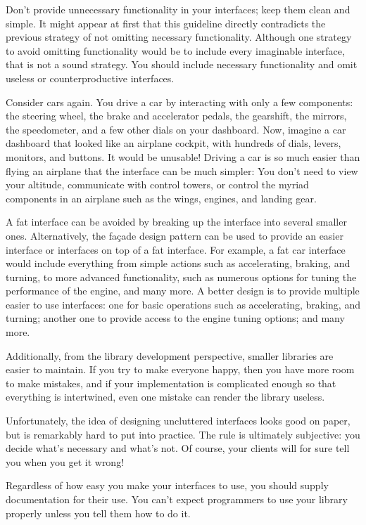 Don’t provide unnecessary functionality in your interfaces; keep them clean and simple. It might appear at first that this guideline directly contradicts the previous strategy of not omitting necessary functionality. Although one strategy to avoid omitting functionality would be to include every imaginable interface, that is not a sound strategy. You should include necessary functionality and omit useless or counterproductive interfaces.

Consider cars again. You drive a car by interacting with only a few components: the steering wheel, the brake and accelerator pedals, the gearshift, the mirrors, the speedometer, and a few other dials on your dashboard. Now, imagine a car dashboard that looked like an airplane cockpit, with hundreds of dials, levers, monitors, and buttons. It would be unusable! Driving a car is so much easier than flying an airplane that the interface can be much simpler: You don’t need to view your altitude, communicate with control towers, or control the myriad components in an airplane such as the wings, engines, and landing gear.

A fat interface can be avoided by breaking up the interface into several smaller ones. Alternatively, the façade design pattern can be used to provide an easier interface or interfaces on top of a fat interface. For example, a fat car interface would include everything from simple actions such as accelerating, braking, and turning, to more advanced functionality, such as numerous options for tuning the performance of the engine, and many more. A better design is to provide multiple easier to use interfaces: one for basic operations such as accelerating, braking, and turning; another one to provide access to the engine tuning options; and many more.

Additionally, from the library development perspective, smaller libraries are easier to maintain. If you try to make everyone happy, then you have more room to make mistakes, and if your implementation is complicated enough so that everything is intertwined, even one mistake can render the library useless.

Unfortunately, the idea of designing uncluttered interfaces looks good on paper, but is remarkably hard to put into practice. The rule is ultimately subjective: you decide what’s necessary and what’s not. Of course, your clients will for sure tell you when you get it wrong!


Regardless of how easy you make your interfaces to use, you should supply documentation for their use. You can’t expect programmers to use your library properly unless you tell them how to do it.

